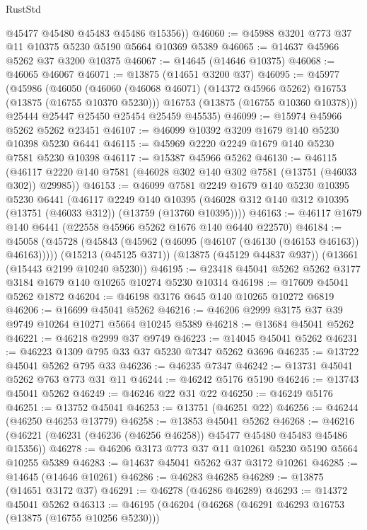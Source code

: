 \begin{lexlean}{RustStd}
\begin{coremodule}
        @45477
        @45480
        @45483
        @45486
        @15356))
@46060 := @45988 @3201 @773 @37 @11 @10375 @5230 @5190 @5664 @10369 @5389
@46065 := @14637 @45966 @5262 @37 @3200 @10375
@46067 := @14645 (@14646 @10375)
@46068 := @46065 @46067
@46071 := @13875 (@14651 @3200 @37)
@46095 := @45977
    (@45986
      (@46050
        (@46060 (@46068 @46071) (@14372 @45966 @5262) @16753 (@13875 (@16755 @10370 @5230)))
        @16753
        (@13875 (@16755 @10360 @10378)))
      @25444
      @25447
      @25450
      @25454
      @25459
      @45535)
@46099 := @15974 @45966 @5262 @5262 @23451
@46107 := @46099 @10392 @3209 @1679 @140 @5230 @10398 @5230 @6441
@46115 := @45969 @2220 @2249 @1679 @140 @5230 @7581 @5230 @10398
@46117 := @15387 @45966 @5262
@46130 := @46115
    (@46117 @2220 @140 @7581 (@46028 @302 @140 @302 @7581 (@13751 (@46033 @302)) @29985))
@46153 := @46099
    @7581
    @2249
    @1679
    @140
    @5230
    @10395
    @5230
    @6441
    (@46117
      @2249
      @140
      @10395
      (@46028 @312 @140 @312 @10395 (@13751 (@46033 @312)) (@13759 (@13760 @10395))))
@46163 := @46117 @1679 @140 @6441 (@22558 @45966 @5262 @1676 @140 @6440 @22570)
@46184 := @45058
    (@45728 (@45843 (@45962 (@46095 (@46107 (@46130 (@46153 @46163)) @46163)))))
    (@15213 (@45125 @371))
    (@13875 (@45129 @44837 @937))
    (@13661 (@15443 @2199 @10240 @5230))
@46195 := @23418 @45041 @5262 @5262 @3177 @3184 @1679 @140 @10265 @10274 @5230 @10314
@46198 := @17609 @45041 @5262 @1872
@46204 := @46198 @3176 @645 @140 @10265 @10272 @6819
@46206 := @16699 @45041 @5262
@46216 := @46206 @2999 @3175 @37 @39 @9749 @10264 @10271 @5664 @10245 @5389
@46218 := @13684 @45041 @5262
@46221 := @46218 @2999 @37 @9749
@46223 := @14045 @45041 @5262
@46231 := @46223 @1309 @795 @33 @37 @5230 @7347 @5262 @3696
@46235 := @13722 @45041 @5262 @795 @33
@46236 := @46235 @7347
@46242 := @13731 @45041 @5262 @763 @773 @31 @11
@46244 := @46242 @5176 @5190
@46246 := @13743 @45041 @5262
@46249 := @46246 @22 @31 @22
@46250 := @46249 @5176
@46251 := @13752 @45041
@46253 := @13751 (@46251 @22)
@46256 := @46244 (@46250 @46253 @13779)
@46258 := @13853 @45041 @5262
@46268 := @46216 (@46221 (@46231 (@46236 (@46256 @46258)) @45477 @45480 @45483 @45486 @15356))
@46278 := @46206 @3173 @773 @37 @11 @10261 @5230 @5190 @5664 @10255 @5389
@46283 := @14637 @45041 @5262 @37 @3172 @10261
@46285 := @14645 (@14646 @10261)
@46286 := @46283 @46285
@46289 := @13875 (@14651 @3172 @37)
@46291 := @46278 (@46286 @46289)
@46293 := @14372 @45041 @5262
@46313 := @46195
    (@46204
      (@46268
        (@46291 @46293 @16753 (@13875 (@16755 @10256 @5230)))

\end{coremodule}
\end{lexlean}
